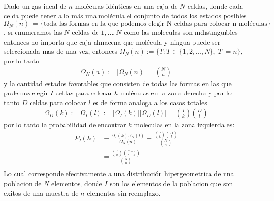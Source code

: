 \begin{answer}
    Dado un gas ideal de $n$ moléculas idénticas en una caja de $N$ celdas, donde cada celda puede tener a lo más una molécula 
    el conjunto de todos los estados posibles $\Omega_N(n) := \{\text{toda las formas en la que podemos elegir N celdas para colocar n moléculas}\}$,
    si enumeramos las $N$ celdas de $1,\dots,N$ como las moleculas son indistinguibles  entonces no importa que caja almacena que molécula y ningua puede ser seleccionada mas de una vez, entonces 
    $\Omega_N(n) := \{T: T \subset \{1,2,\dots,N\}, |T| = n\}$, por lo tanto 
    \begin{align*}
        \Omega_N(n) := | \Omega_N(n) | = {N \choose n}
    \end{align*}
    y la cantidad estados favorables que consisten de todas las formas en las que podemos elegir $I$ celdas para colocar $k$ moléculas en la zona derecha y por lo tanto $D$ celdas para colocar $l$ es 
    de forma analoga a los casos totales 
    \begin{align*}
        \Omega_D(k) := \Omega_I(l) := |\Omega_I(k)||\Omega_D(l)| = {I \choose k}{D \choose l}
    \end{align*} 
    por lo tanto la probabilidad de encontrar $k$ moleculas en la zona izquierda es:
    \begin{align*}
        P_I(k) &= \frac{\Omega_I(k) \Omega_D(l)}{\Omega_N(n)} = \frac{{I \choose k}{D \choose l}}{{N \choose n}}\\
        &= \frac{{I \choose k}{N-I \choose n-k}}{{N \choose n}}\\
    \end{align*}
    Lo cual corresponde efectivamente a una distribución hipergeometrica de una poblacion de $N$ elementos, donde $I$ son los elementos de la poblacion que son exitos de una muestra de $n$ elementos sin reemplazo. 
\end{answer}
